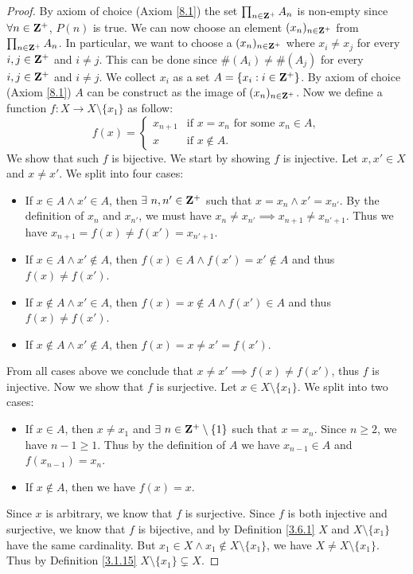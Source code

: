 \begin{proof}
    By axiom of choice (Axiom \ref{8.1}) the set \(\prod_{n \in \mathbf{Z}^+} A_n\) is non-empty since \(\forall n \in \mathbf{Z}^+\), \(P(n)\) is true.
    We can now choose an element \((x_n)_{n \in \mathbf{Z}^+}\) from \(\prod_{n \in \mathbf{Z}^+} A_n\).
    In particular, we want to choose a \((x_n)_{n \in \mathbf{Z}^+}\) where \(x_i \neq x_j\) for every \(i, j \in \mathbf{Z}^+\) and \(i \neq j\).
    This can be done since \(\#(A_i) \neq \#(A_j)\) for every \(i, j \in \mathbf{Z}^+\) and \(i \neq j\).
    We collect \(x_i\) as a set \(A = \{x_i : i \in \mathbf{Z}^+\}\).
    By axiom of choice (Axiom \ref{8.1}) \(A\) can be construct as the image of \((x_n)_{n \in \mathbf{Z}^+}\).
    Now we define a function \(f : X \to X \setminus \{x_1\}\) as follow:
    \[
        f(x) = \begin{cases}
            x_{n + 1} & \text{if } x = x_n \text{ for some } x_n \in A, \\
            x         & \text{if } x \notin A.
        \end{cases}
    \]
    We show that such \(f\) is bijective.
    We start by showing \(f\) is injective.
    Let \(x, x' \in X\) and \(x \neq x'\).
    We split into four cases:
    \begin{itemize}
        \item If \(x \in A \land x' \in A\), then \(\exists\ n, n' \in \mathbf{Z}^+\) such that \(x = x_n \land x' = x_{n'}\).
              By the definition of \(x_n\) and \(x_{n'}\), we must have \(x_n \neq x_{n'} \implies x_{n + 1} \neq x_{n' + 1}\).
              Thus we have \(x_{n + 1} = f(x) \neq f(x') = x_{n' + 1}\).
        \item If \(x \in A \land x' \notin A\), then \(f(x) \in A \land f(x') = x' \notin A\) and thus \(f(x) \neq f(x')\).
        \item If \(x \notin A \land x' \in A\), then \(f(x) = x \notin A \land f(x') \in A\) and thus \(f(x) \neq f(x')\).
        \item If \(x \notin A \land x' \notin A\), then \(f(x) = x \neq x' = f(x')\).
    \end{itemize}
    From all cases above we conclude that \(x \neq x' \implies f(x) \neq f(x')\), thus \(f\) is injective.
    Now we show that \(f\) is surjective.
    Let \(x \in X \setminus \{x_1\}\).
    We split into two cases:
    \begin{itemize}
        \item If \(x \in A\), then \(x \neq x_1\) and \(\exists\ n \in \mathbf{Z}^+ \setminus \{1\}\) such that \(x = x_n\).
              Since \(n \geq 2\), we have \(n - 1 \geq 1\).
              Thus by the definition of \(A\) we have \(x_{n - 1} \in A\) and \(f(x_{n - 1}) = x_n\).
        \item If \(x \notin A\), then we have \(f(x) = x\).
    \end{itemize}
    Since \(x\) is arbitrary, we know that \(f\) is surjective.
    Since \(f\) is both injective and surjective, we know that \(f\) is bijective, and by Definition \ref{3.6.1} \(X\) and \(X \setminus \{x_1\}\) have the same cardinality.
    But \(x_1 \in X \land x_1 \notin X \setminus \{x_1\}\), we have \(X \neq X \setminus \{x_1\}\).
    Thus by Definition \ref{3.1.15} \(X \setminus \{x_1\} \subsetneq X\).


\end{proof}
